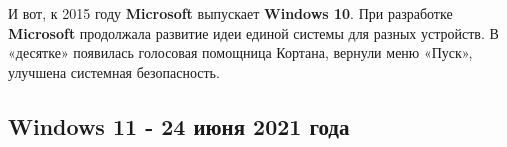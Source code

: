 \documentclass[14pt, a4paper]{article}
\begin{document}
И вот, к 2015 году \textbf{Microsoft} выпускает \textbf{Windows 10}. При разработке \textbf{Microsoft} продолжала развитие идеи
единой системы для разных устройств. В «десятке» появилась голосовая помощница Кортана,
вернули меню «Пуск», улучшена системная безопасность. 

\begin{figure}[h]%
    \centering
    \label{framework} %
\end{figure} \newpage


\begin{centering}
    \subsection*{Windows 11 - 24 июня 2021 года}
\end{centering}

\begin{figure}[h]%
    \centering
    \label{framework} %
\end{figure}
\end{document}
